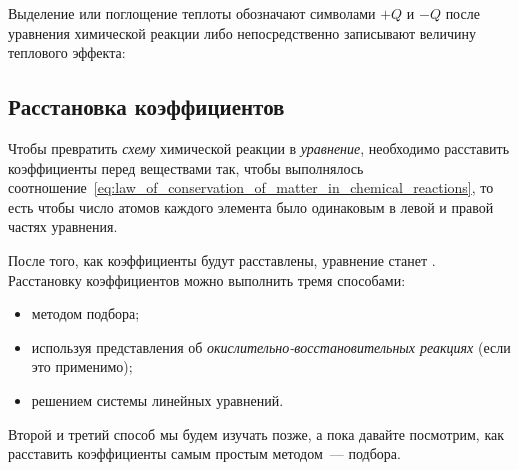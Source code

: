
Выделение или поглощение теплоты обозначают символами $+Q$ и $-Q$ после уравнения химической реакции либо непосредственно записывают величину теплового эффекта:


\subsection*{Расстановка коэффициентов}\label{sec:setting_the_coefficients}

Чтобы превратить \emph{схему} химической реакции в \emph{уравнение}, необходимо расставить коэффициенты перед веществами так, чтобы выполнялось соотношение~\eqref{eq:law_of_conservation_of_matter_in_chemical_reactions}, то есть чтобы число атомов каждого элемента было одинаковым в левой и правой частях уравнения.

После того, как коэффициенты будут расставлены, уравнение станет . Расстановку коэффициентов можно выполнить тремя способами:

\begin{itemize}
    \item методом подбора;
    \item используя представления об \emph{окислительно-восстановительных реакциях} (если это применимо);
    \item решением системы линейных уравнений.
\end{itemize}

Второй и третий способ мы будем изучать позже, а пока давайте посмотрим, как расставить коэффициенты самым простым методом~--- подбора.

